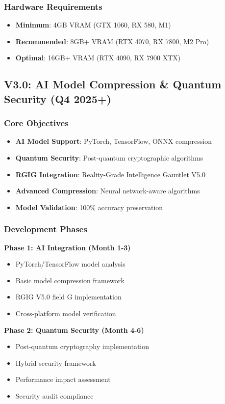 \documentclass[12pt,a4paper]{article}
\begin{document}
\subsubsection{Hardware Requirements}
\begin{itemize}
    \item \textbf{Minimum}: 4GB VRAM (GTX 1060, RX 580, M1)
    \item \textbf{Recommended}: 8GB+ VRAM (RTX 4070, RX 7800, M2 Pro)
    \item \textbf{Optimal}: 16GB+ VRAM (RTX 4090, RX 7900 XTX)
\end{itemize}

\subsection{V3.0: AI Model Compression \& Quantum Security (Q4 2025+)}

\subsubsection{Core Objectives}
\begin{itemize}
    \item \textbf{AI Model Support}: PyTorch, TensorFlow, ONNX compression
    \item \textbf{Quantum Security}: Post-quantum cryptographic algorithms
    \item \textbf{RGIG Integration}: Reality-Grade Intelligence Gauntlet V5.0
    \item \textbf{Advanced Compression}: Neural network-aware algorithms
    \item \textbf{Model Validation}: 100\% accuracy preservation
\end{itemize}

\subsubsection{Development Phases}
\textbf{Phase 1: AI Integration (Month 1-3)}
\begin{itemize}
    \item PyTorch/TensorFlow model analysis
    \item Basic model compression framework
    \item RGIG V5.0 field G implementation
    \item Cross-platform model verification
\end{itemize}

\textbf{Phase 2: Quantum Security (Month 4-6)}
\begin{itemize}
    \item Post-quantum cryptography implementation
    \item Hybrid security framework
    \item Performance impact assessment
    \item Security audit compliance
\end{itemize}
\end{document}
